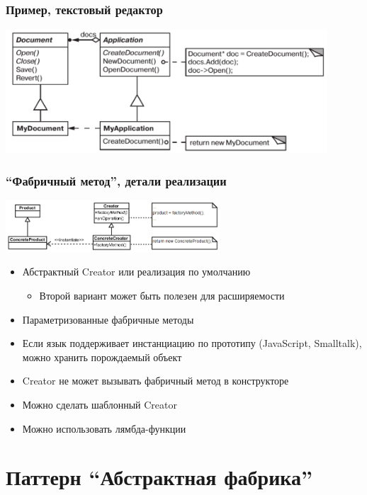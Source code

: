 \documentclass{../../slides-style}
\begin{document}
    \begin{frame}
        \frametitle{Пример, текстовый редактор}
        \begin{center}
            \includegraphics[width=0.9\textwidth]{factoryMethodForTextEditor.png}
        \end{center}
    \end{frame}

    \begin{frame}
        \frametitle{``Фабричный метод'', детали реализации}
        \begin{center}
            \includegraphics[width=0.6\textwidth]{factoryMethod.png}
        \end{center}
        \begin{itemize}
            \item Абстрактный Creator или реализация по умолчанию
            \begin{itemize}
                \item Второй вариант может быть полезен для расширяемости
            \end{itemize}
            \item Параметризованные фабричные методы
            \item Если язык поддерживает инстанциацию по прототипу (JavaScript, Smalltalk), можно хранить порождаемый объект
            \item Creator не может вызывать фабричный метод в конструкторе
            \item Можно сделать шаблонный Creator
            \item Можно использовать лямбда-функции
        \end{itemize}
    \end{frame}

    \section{Паттерн ``Абстрактная фабрика''}
\end{document}
